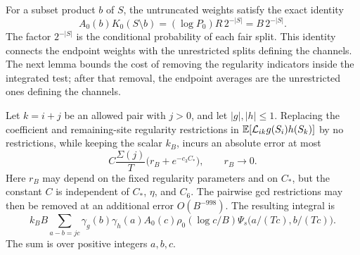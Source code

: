 For a subset product \(b\) of \(S\), the untruncated weights satisfy
the exact identity
\[
 A_0(b)K_0(S\setminus b)
 = (\log P_0)R\,2^{-|S|}=B\,2^{-|S|}.
\]
The factor \(2^{-|S|}\) is the conditional probability of each fair
split.  This identity connects the endpoint weights with the unrestricted
splits defining the channels.  The next lemma bounds the cost of removing
the regularity indicators inside the integrated test; after that removal,
the endpoint averages are the unrestricted ones defining the channels.

\begin{lemma}\label{lem:kernel-cutoffs}
Let \(k=i+j\) be an allowed pair with \(j>0\), and let
\(\lvert g\rvert,\lvert h\rvert\le1\).  Replacing the coefficient and
remaining-site regularity restrictions in
\(\mathbb E[\mathcal L_{ik}g(S_i)h(S_k)]\) by no restrictions, while keeping
the scalar \(k_B\), incurs an absolute error at most
\begin{equation}\label{eq:33}
 C\frac{\Sigma(j)}{T}
       \big(r_B+e^{-c_3C_*}\big),\qquad r_B\longrightarrow0.
\end{equation}
Here \(r_B\) may depend on the fixed regularity parameters and on
\(C_*\), but the constant \(C\) is independent of \(C_*\), \(\eta\),
and \(C_6\).  The pairwise gcd restrictions may then be removed at an
additional error \(O(B^{-998})\).  The resulting integral is
\begin{equation}\label{eq:34}
 k_B B\sum_{a-b=jc}\gamma_g(b)\gamma_h(a)A_0(c)
       \rho_0(\log c/B)
       \Psi_s\big(a/(Tc),b/(Tc)\big).
\end{equation}
The sum is over positive integers \(a,b,c\).
\end{lemma}

